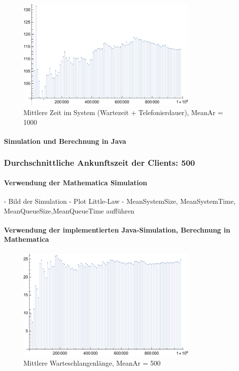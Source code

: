 \begin{figure}[htpb]
	\centering
	\includegraphics[width=0.8\textwidth]{abbildungen/auswertung1000/meanSystemTimePlot.pdf}
	\caption{Mittlere Zeit im System (Wartezeit + Telefonierdauer), MeanAr = 1000}
	\label{fig:meanSystemTime1000}
\end{figure}

\paragraph{Simulation und Berechnung in Java}


\subsubsection{Durchschnittliche Ankunftszeit der Clients: 500}
\paragraph{Verwendung der Mathematica Simulation}
- Bild der Simulation 
- Plot Little-Law
- MeanSystemSize, MeanSystemTime, MeanQueueSize,MeanQueueTime aufführen
\paragraph{Verwendung der implementierten Java-Simulation, Berechnung in Mathematica}
\begin{figure}[htpb]
	\centering
	\includegraphics[width=0.8\textwidth]{abbildungen/auswertung500/meanQueueTimePlot.pdf}
	\caption{Mittlere Warteschlangenlänge, MeanAr = 500}
	\label{fig:meanQueueTime500}
\end{figure}

